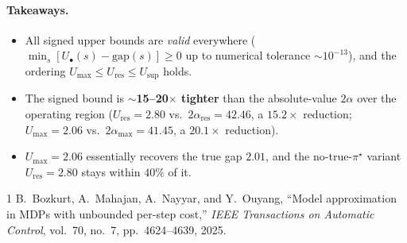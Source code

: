 \documentclass[11pt]{article}
\begin{document}
\paragraph{Takeaways.}
\begin{itemize}
\item All signed upper bounds are \emph{valid} everywhere
($\min_s[U_\bullet(s)-\text{gap}(s)]\ge 0$ up to numerical tolerance
$\sim10^{-13}$), and the ordering $U_{\max}\le U_{\mathrm{res}}\le U_{\sup}$ holds.
\item The signed bound is \textbf{$\sim$15--20$\times$ tighter} than the
absolute-value $2\alpha$ over the operating region ($U_{\mathrm{res}}=2.80$ vs.\
$2\alpha_{\mathrm{res}}=42.46$, a $15.2\times$ reduction; $U_{\max}=2.06$ vs.\
$2\alpha_{\max}=41.45$, a $20.1\times$ reduction).
\item $U_{\max}=2.06$ essentially recovers the true gap $2.01$, and the
no-true-$\pi^\star$ variant $U_{\mathrm{res}}=2.80$ stays within $40\%$ of it.
\end{itemize}

\begin{thebibliography}{1}
 B.~Bozkurt, A.~Mahajan, A.~Nayyar, and Y.~Ouyang, ``Model
approximation in MDPs with unbounded per-step cost,'' \emph{IEEE Transactions on
Automatic Control}, vol.~70, no.~7, pp.~4624--4639, 2025.
\end{thebibliography}
\end{document}
